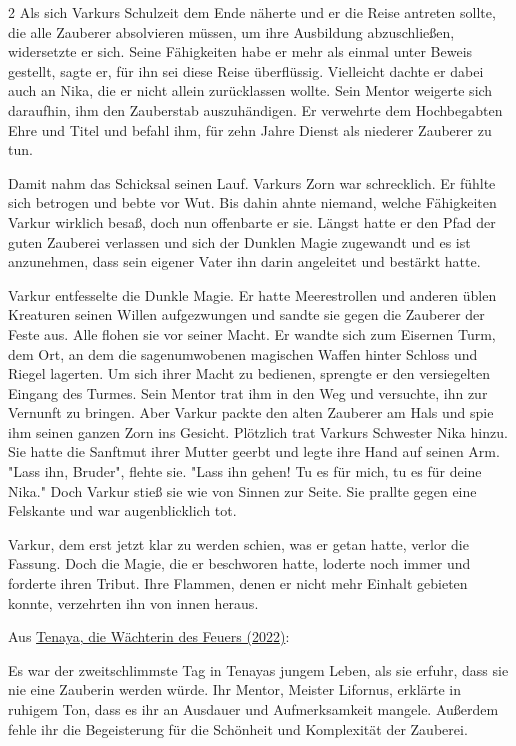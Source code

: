\documentclass[10pt, a4paper, oneside]{book}
\begin{document}
\begin{multicols}{2}
Als sich Varkurs Schulzeit dem Ende näherte und er die Reise antreten sollte, die alle Zauberer absolvieren müssen, um ihre Ausbildung abzuschließen, widersetzte er sich. Seine Fähigkeiten habe er mehr als einmal unter Beweis gestellt, sagte er, für ihn sei diese Reise überflüssig. Vielleicht dachte er dabei auch an Nika, die er nicht allein zurücklassen wollte. Sein Mentor weigerte sich daraufhin, ihm den Zauberstab auszuhändigen. Er verwehrte dem Hochbegabten Ehre und Titel und befahl ihm, für zehn Jahre Dienst als niederer Zauberer zu tun.

Damit nahm das Schicksal seinen Lauf. Varkurs Zorn war schrecklich. Er fühlte sich betrogen und bebte vor Wut. Bis dahin ahnte niemand, welche Fähigkeiten Varkur wirklich besaß, doch nun offenbarte er sie. Längst hatte er den Pfad der guten Zauberei verlassen und sich der Dunklen Magie zugewandt und es ist anzunehmen, dass sein eigener Vater ihn darin angeleitet und bestärkt hatte.

Varkur entfesselte die Dunkle Magie. Er hatte Meerestrollen und anderen üblen Kreaturen seinen Willen aufgezwungen und sandte sie gegen die Zauberer der Feste aus. Alle flohen sie vor seiner Macht. Er wandte sich zum Eisernen Turm, dem Ort, an dem die sagenumwobenen magischen Waffen hinter Schloss und Riegel lagerten. Um sich ihrer Macht zu bedienen, sprengte er den versiegelten Eingang des Turmes. Sein Mentor trat ihm in den Weg und versuchte, ihn zur Vernunft zu bringen. Aber Varkur packte den alten Zauberer am Hals und spie ihm seinen ganzen Zorn ins Gesicht. Plötzlich trat Varkurs Schwester Nika hinzu. Sie hatte die Sanftmut ihrer Mutter geerbt und legte ihre Hand auf seinen Arm. "Lass ihn, Bruder", flehte sie. "Lass ihn gehen! Tu es für mich, tu es für deine Nika." Doch Varkur stieß sie wie von Sinnen zur Seite. Sie prallte gegen eine Felskante und war augenblicklich tot.

Varkur, dem erst jetzt klar zu werden schien, was er getan hatte, verlor die Fassung. Doch die Magie, die er beschworen hatte, loderte noch immer und forderte ihren Tribut. Ihre Flammen, denen er nicht mehr Einhalt gebieten konnte, verzehrten ihn von innen heraus.




\begin{center}
     Aus \hyperref[storytext-2022-tenaya-die-waechterin-des-feuers]{Tenaya, die Wächterin des Feuers (2022)}:
\end{center}

Es war der zweitschlimmste Tag in Tenayas jungem Leben, als sie erfuhr, dass sie nie eine Zauberin werden würde. Ihr Mentor, Meister Lifornus, erklärte in ruhigem Ton, dass es ihr an Ausdauer und Aufmerksamkeit mangele. Außerdem fehle ihr die Begeisterung für die Schönheit und Komplexität der Zauberei.


\end{multicols}
\end{document}
